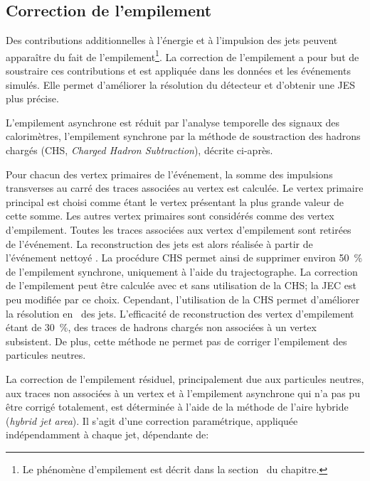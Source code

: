 \subsection{Correction de l'empilement}\label{chapter-JERC-section-CMS-subsec-PU}
Des contributions additionnelles à l'énergie et à l'impulsion des jets peuvent apparaître du fait de l'empilement\footnote{Le phénomène d'empilement est décrit dans la section~ du chapitre.}.
La correction de l'empilement a pour but de soustraire ces contributions et est appliquée dans les données et les événements simulés.
Elle permet d'améliorer la résolution du détecteur et d'obtenir une JES plus précise.
\par L'empilement asynchrone est réduit par l'analyse temporelle des signaux des calorimètres,
l'empilement synchrone par la méthode de soustraction des hadrons chargés (CHS, \emph{Charged Hadron Subtraction}), décrite ci-après.
\par Pour chacun des vertex primaires de l'événement, la somme des impulsions transverses au carré des traces associées au vertex est calculée.
Le vertex primaire principal est choisi comme étant le vertex présentant la plus grande valeur de cette somme.
Les autres vertex primaires sont considérés comme des vertex d'empilement.
Toutes les traces associées aux vertex d'empilement sont retirées de l'événement.
La reconstruction des jets est alors réalisée à partir de l'événement \og nettoyé \fg.
La procédure CHS permet ainsi de supprimer environ \SI{50}{\%} de l'empilement synchrone, uniquement à l'aide du trajectographe.
La correction de l'empilement peut être calculée avec et sans utilisation de la CHS; la JEC est peu modifiée par ce choix. Cependant, l'utilisation de la CHS permet d'améliorer la résolution en \pT\ des jets.
L'efficacité de reconstruction des vertex d'empilement étant de \SI{30}{\%}, des traces de hadrons chargés non associées à un vertex subsistent.
De plus, cette méthode ne permet pas de corriger l'empilement des particules neutres.
\par La correction de l'empilement résiduel, principalement due aux particules neutres, aux traces non associées à un vertex et à l'empilement asynchrone qui n'a pas pu être corrigé totalement, est déterminée à l'aide de la méthode de l'aire hybride (\emph{hybrid jet area}).
Il s'agit d'une correction paramétrique, appliquée indépendamment à chaque jet, dépendante de:
